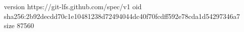 version https://git-lfs.github.com/spec/v1
oid sha256:2b92decdd70c1e10481238d72494044dc40f70fcdff592e78cda1d54297346a7
size 87560
